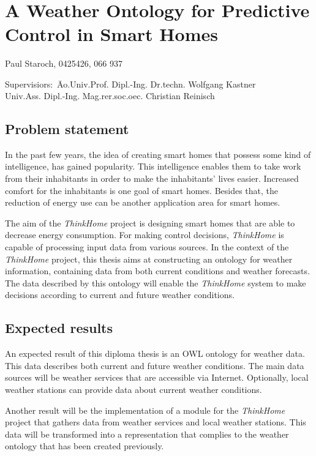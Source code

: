 \documentclass{scrartcl}
\begin{document}
~\vspace{0.5cm}
\section*{A Weather Ontology for Predictive Control in Smart Homes}
Paul Staroch, 0425426, 066 937
\begin{tabbing}
Supervisiors:\ \= Ao.Univ.Prof. Dipl.-Ing. Dr.techn. Wolfgang Kastner\\
\> Univ.Ass. Dipl.-Ing. Mag.rer.soc.oec. Christian Reinisch
\end{tabbing}

\subsection*{Problem statement}
In the past few years, the idea of creating smart homes that possess some kind of intelligence, has gained popularity. This intelligence enables them to take work from their inhabitants in order to make the inhabitants' lives easier. Increased comfort for the inhabitants is one goal of smart homes. Besides that, the reduction of energy use can be another application area for smart homes.

The aim of the \textit{ThinkHome} project \cite{CR2011-TH_Journal} \cite{CR2010-DEST_ThinkHome} is designing smart homes that are able to decrease energy consumption. For making control decisions, \textit{ThinkHome} is capable of processing input data from various sources. In the context of the \textit{ThinkHome} project, this thesis aims at constructing an ontology for weather information, containing data from both current conditions and weather forecasts. The data described by this ontology will enable the \textit{ThinkHome} system to make decisions according to current and future weather conditions.

\subsection*{Expected results}
An expected result of this diploma thesis is an OWL ontology for weather data. This data describes both current and future weather conditions. The main data sources will be weather services that are accessible via Internet. Optionally, local weather stations can provide data about current weather conditions.

Another result will be the implementation of a module for the \textit{ThinkHome} project that gathers data from weather services and local weather stations. This data will be transformed into a representation that complies to the weather ontology that has been created previously.
\end{document}
